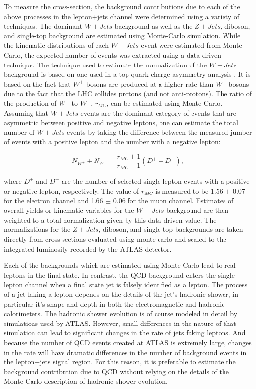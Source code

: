 To measure the cross-section, the background contributions due to each of the above processes in the lepton+jets channel were determined using a variety of techniques.
The dominant $W+Jets$ background as well as the $Z+Jets$, diboson, and single-top background are estimated using Monte-Carlo simulation.
While the kinematic distributions of each $W+Jets$ event were estimated from Monte-Carlo, the expected number of events was extracted using a data-driven technique.
The technique used to estimate the normalization of the $W+Jets$ background is based on one used in a top-quark charge-asymmetry analysis \cite{CHARGE_ASYMMETRY}.
It is based on the fact that $W^{+}$ bosons are produced at a higher rate than $W^{-}$ bosons due to the fact that the LHC collides protons (and not anti-protons).
The ratio of the production of $W^{+}$ to $W^{-}$, $r_{MC}$, can be estimated using Monte-Carlo.  Assuming that $W+Jets$ events are the dominant category of events that are asymmetric between positive and negative leptons, one can estimate the total number of $W+Jets$ events by taking the difference between the measured jumber of events with a positive lepton and the number with a negative lepton:

\begin{equation}
  N_{W^{+}} + N_{W^{-}} = \frac{r_{MC} + 1}{r_{MC} - 1}(D^{+} - D^{-}),
\end{equation}

where $D^{+}$ and $D^{-}$ are the number of selected single-lepton events with a positive or negative lepton, respectively.
The value of $r_{MC}$ is measured to be 1.56 $\pm$ 0.07 for the electron channel and 1.66 $\pm$ 0.06 for the muon channel.
Estimates of overall yields or kinematic variables for the $W+Jets$ background are then weighted to a total normalization given by this data-driven value.
The normalizations for the $Z+Jets$, diboson, and single-top backgrounds are taken directly from cross-sections evaluated using monte-carlo and scaled to the integrated luminosity recorded by the ATLAS detector.

Each of the backgrounds which are estimated using Monte-Carlo lead to real leptons in the final state.
In contrast, the QCD background enters the single-lepton channel when a final state jet is falsely identified as a lepton.
The process of a jet faking a lepton depends on the details of the jet's hadronic shower, in particular it's shape and depth in both the electromagnetic and hadronic calorimeters.
The hadronic shower evolution is of course modeled in detail by simulations used by ATLAS.
However, small differences in the nature of that simulation can lead to significant changes in the rate of jets faking leptons.
And because the number of QCD events created at ATLAS is extremely large, changes in the rate will have dramatic differences in the number of background events in the lepton+jets signal region.
For this reason, it is preferable to estimate the background contribution due to QCD without relying on the details of the Monte-Carlo description of hadronic shower evolution.

